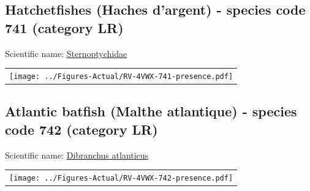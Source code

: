 \documentclass[12pt]{article}\usepackage[]{graphicx}\usepackage[]{color}
\begin{document}
\renewcommand\thefigure{\thesubsection\Alph{figure}}

\setcounter{figure}{0}

\hypertarget{sec:741}{%
\subsection{Hatchetfishes (Haches d'argent) - species code 741 (category LR)}\label{sec:741}}

  


Scientific name: \href{http://www.marinespecies.org/aphia.php?p=taxdetails\&id=125603}{Sternoptychidae} \newline
\begin{minipage}{1.0\textwidth}
 \begin{tabular}{c}
\texttt{[image: ../Figures-Actual/RV-4VWX-741-presence.pdf]} \\ 
\end{tabular} 
\end{minipage}
\clearpage

\renewcommand\thefigure{\thesubsection\Alph{figure}}

\setcounter{figure}{0}

\hypertarget{sec:742}{%
\subsection{Atlantic batfish (Malthe atlantique) - species code 742 (category LR)}\label{sec:742}}

  


Scientific name: \href{http://www.marinespecies.org/aphia.php?p=taxdetails\&id=126558}{Dibranchus atlanticus} \newline
\begin{minipage}{1.0\textwidth}
 \begin{tabular}{c}
\texttt{[image: ../Figures-Actual/RV-4VWX-742-presence.pdf]} \\ 
\end{tabular} 
\end{minipage}
\clearpage

\renewcommand\thefigure{\thesubsection\Alph{figure}}
\end{document}
